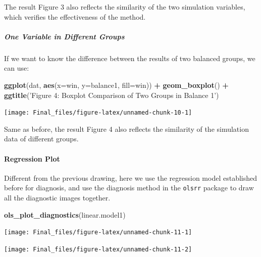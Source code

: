 \documentclass[
]{article}
\newenvironment{Shaded}{\begin{snugshade}}{\end{snugshade}}
\newcommand{\DataTypeTok}[1]{\textcolor[rgb]{0.13,0.29,0.53}{#1}}
\newcommand{\KeywordTok}[1]{\textcolor[rgb]{0.13,0.29,0.53}{\textbf{#1}}}
\newcommand{\NormalTok}[1]{#1}
\newcommand{\OperatorTok}[1]{\textcolor[rgb]{0.81,0.36,0.00}{\textbf{#1}}}
\newcommand{\StringTok}[1]{\textcolor[rgb]{0.31,0.60,0.02}{#1}}
\begin{document}
The result Figure 3 also reflects the similarity of the two simulation
variables, which verifies the effectiveness of the method.

\hypertarget{one-variable-in-different-groups}{%
\subparagraph{One Variable in Different
Groups}\label{one-variable-in-different-groups}}

If we want to know the difference between the results of two balanced
groups, we can use:

\begin{Shaded}
\begin{Highlighting}[]
\KeywordTok{ggplot}\NormalTok{(dat, }\KeywordTok{aes}\NormalTok{(}\DataTypeTok{x=}\NormalTok{win, }\DataTypeTok{y=}\NormalTok{balance1, }\DataTypeTok{fill=}\NormalTok{win)) }\OperatorTok{+}
\StringTok{  }\KeywordTok{geom_boxplot}\NormalTok{() }\OperatorTok{+}
\StringTok{  }\KeywordTok{ggtitle}\NormalTok{(}\StringTok{'Figure 4: Boxplot Comparison of Two Groups in Balance 1'}\NormalTok{)}
\end{Highlighting}
\end{Shaded}

\begin{center}\texttt{[image: Final\_files/figure-latex/unnamed-chunk-10-1]} \end{center}

Same as before, the result Figure 4 also reflects the similarity of the
simulation data of different groups.

\hypertarget{regression-plot}{%
\paragraph{Regression Plot}\label{regression-plot}}

Different from the previous drawing, here we use the regression model
established before for diagnosis, and use the diagnosis method in the
\texttt{olsrr} package to draw all the diagnostic images together.

\begin{Shaded}
\begin{Highlighting}[]
\KeywordTok{ols_plot_diagnostics}\NormalTok{(linear.model1)}
\end{Highlighting}
\end{Shaded}

\begin{center}\texttt{[image: Final\_files/figure-latex/unnamed-chunk-11-1]} \end{center}

\begin{center}\texttt{[image: Final\_files/figure-latex/unnamed-chunk-11-2]} \end{center}
\end{document}
